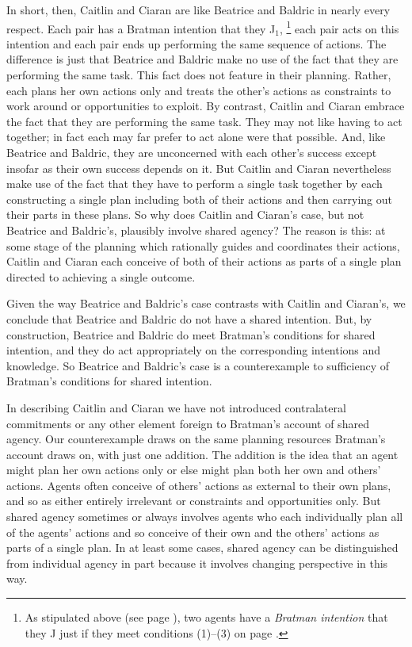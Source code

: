 \documentclass[12pt,\papersize]{extarticle}
\begin{document}
In short, then, Caitlin and Ciaran are like Beatrice and Baldric in nearly every respect. 
Each pair has a Bratman intention that they J$_1$,%
\footnote{
As stipulated above (see page \pageref*{df:bratman_intention}), 
two agents have a \emph{Bratman intention} that they J just if they meet conditions (1)--(3) on page \pageref{quote:bratman_account}.
}
%
 each pair acts on this intention and each pair ends up performing the same sequence of actions.
The difference is just that Beatrice and Baldric make no use of the fact that they are performing the same task.
	This fact does not feature in their planning. 
	Rather, each plans her own actions only and treats the other's actions as constraints to work around or opportunities to exploit.
By contrast, Caitlin and Ciaran embrace the fact that they are performing the same task. 
They may not like having to act together; in fact each may far prefer to act alone were that possible.
And, like Beatrice and Baldric, they are unconcerned with each other's success except insofar as their own success depends on it.
But Caitlin and Ciaran nevertheless make use of the fact that they have to perform a single task together by each constructing a single plan including both of their actions and then carrying out their parts in these plans.
So why does Caitlin and Ciaran's case, but not Beatrice and Baldric's, plausibly involve shared agency?
The reason is  this:
	 at some stage of the planning which rationally guides and coordinates their actions,
	Caitlin and Ciaran each conceive of both of their actions as parts of a single plan directed to achieving a single outcome.


Given the way Beatrice and Baldric's case contrasts with Caitlin and Ciaran's,
we conclude that Beatrice and Baldric do not have a shared intention.
But, by construction, 
 Beatrice and Baldric do meet Bratman's conditions for shared intention, and they do act appropriately on the corresponding intentions and knowledge. 
 So Beatrice and Baldric's case  is a counterexample to sufficiency of Bratman's conditions for shared intention.


In describing Caitlin and Ciaran we have not introduced contralateral commitments or any other element foreign to Bratman's account of shared agency. 
Our counterexample draws on the same planning resources Bratman's account draws on, with just one addition.
The addition is the idea that an agent 
	might plan  her own actions only 
	or else 
	might plan both her own and others' actions.
Agents often conceive of others' actions as external to their own plans, and so as either entirely irrelevant or constraints and opportunities only.
But shared agency sometimes or always involves agents who each individually plan all of the agents' actions and so conceive of their own and the others' actions  as parts of a single plan.
In at least some cases, shared agency can be distinguished from individual agency in part because it involves changing perspective in this way.
\end{document}
